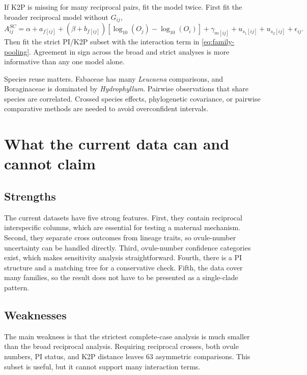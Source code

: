 \documentclass[12pt]{article}
\begin{document}
If K2P is missing for many reciprocal pairs, fit the model twice. First fit the broader reciprocal model without $G_{ij}$,
\begin{equation}
A^{SC}_{ij}=\alpha+a_{f[ij]}+
\left(\beta+b_{f[ij]}\right)\left[\log_{10}(O_j)-\log_{10}(O_i)\right]
+\gamma_{m[ij]}+u_{s_1[ij]}+u_{s_2[ij]}+\epsilon_{ij}.
\label{eq:family-noG}
\end{equation}
Then fit the strict PI/K2P subset with the interaction term in \eqref{eq:family-pooling}. Agreement in sign across the broad and strict analyses is more informative than any one model alone.

\begin{cautionbox}
Species reuse matters. Fabaceae has many \emph{Leucaena} comparisons, and Boraginaceae is dominated by \emph{Hydrophyllum}. Pairwise observations that share species are correlated. Crossed species effects, phylogenetic covariance, or pairwise comparative methods are needed to avoid overconfident intervals.
\end{cautionbox}

\section{What the current data can and cannot claim}

\subsection{Strengths}

The current datasets have five strong features. First, they contain reciprocal interspecific columns, which are essential for testing a maternal mechanism. Second, they separate cross outcomes from lineage traits, so ovule-number uncertainty can be handled directly. Third, ovule-number confidence categories exist, which makes sensitivity analysis straightforward. Fourth, there is a PI structure and a matching tree for a conservative check. Fifth, the data cover many families, so the result does not have to be presented as a single-clade pattern.

\subsection{Weaknesses}

The main weakness is that the strictest complete-case analysis is much smaller than the broad reciprocal analysis. Requiring reciprocal crosses, both ovule numbers, PI status, and K2P distance leaves 63 asymmetric comparisons. This subset is useful, but it cannot support many interaction terms.
\end{document}

